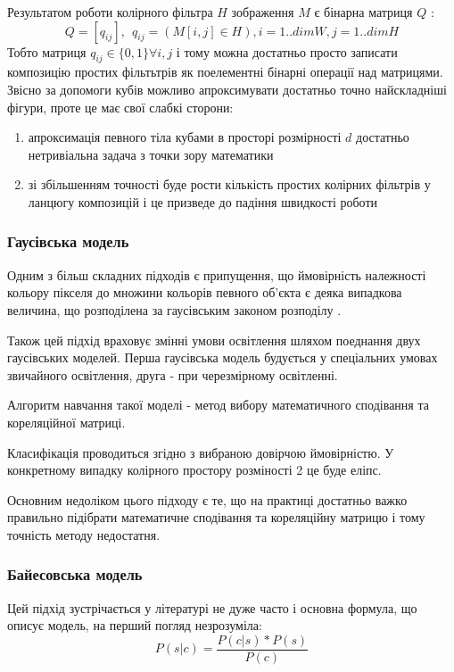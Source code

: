 Результатом роботи колірного фільтра $H$ зображення $M$ є бінарна матриця $Q$ :
\begin{equation}
	\label{eq:simple_color_filter_result}
	Q = [q_{ij}], \:\: q_{ij} = ( M[i,j] \in H ), i=1..dimW, j=1..dimH
\end{equation}
Тобто матриця $q_{ij} \in \{0,1\} \forall i,j$ і тому можна достатньо просто записати композицію простих фільтьтрів як поелементні бінарні операції над матрицями. Звісно за допомоги кубів можливо апроксимувати достатньо точно найскладніші фігури, проте це має свої слабкі сторони:
\begin{enumerate}
	\item апроксимація певного тіла кубами в просторі розмірності $d$ достатньо нетривіальна задача з точки зору математики
	\item зі збільшенням точності буде рости кількість простих колірних фільтрів у ланцюгу композицій і це призведе до падіння швидкості роботи
\end{enumerate}

\subsubsection{Гаусівська модель}

Одним з більш складних підходів є припущення, що ймовірність належності кольору пікселя до множини кольорів певного об'єкта є деяка випадкова величина, що розподілена за гаусівським законом розподілу \cite{AdaptiveBigaussian}.

Також цей підхід враховує змінні умови освітлення шляхом поеднання двух гаусівських моделей. Перша гаусівська модель будується у спеціальних умовах звичайного освітлення, друга - при черезмірному освітленні.

Алгоритм навчання такої моделі - метод вибору математичного сподівання та кореляційної матриці.

Класифікація проводиться згідно з вибраною довірчою ймовірністю. У конкретному випадку колірного простору розміності 2 це буде еліпс.

Основним недоліком цього підходу є те, що на практиці достатньо важко правильно підібрати математичне сподівання та кореляційну матрицю і тому точність методу недостатня.

\subsubsection{Байесовська модель}

Цей підхід зустрічається у літературі не дуже часто і основна формула, що описує модель, на перший погляд незрозуміла:
\begin{equation}
\label{eq:bayesian_classifier}
P(s|c) = \frac{P(c|s) * P(s)}{P(c)}
\end{equation}

